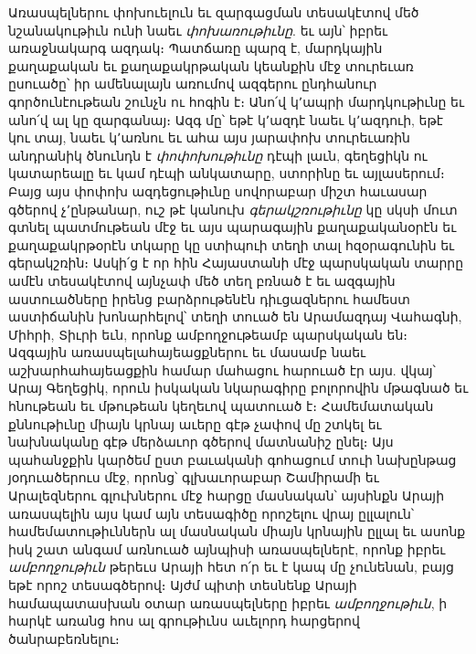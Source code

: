 \documentclass{article}
\begin{document}
{Առասպելներու փոխուելուն եւ զարգացման տեսակէտով մեծ նշանակութիւն ունի նաեւ \emph{փոխառութիւնը}. եւ այն՝ իբրեւ առաջնակարգ ազդակ։ Պատճառը պարզ է, մարդկային քաղաքական եւ քաղաքակրթական կեանքին մէջ տուրեւառ ըսուածը՝ իր ամենալայն առումով ազգերու ընդհանուր գործունէութեան շունչն ու հոգին է։ Անո՛վ կ՚ապրի մարդկութիւնը եւ անո՛վ ալ կը զարգանայ։ Ազգ մը՝ եթէ կ՚ազդէ նաեւ կ՚ազդուի, եթէ կու տայ, նաեւ կ՚առնու եւ ահա այս յարափոխ տուրեւառին անդրանիկ ծնունդն է \emph{փոփոխութիւնը} դէպի լաւն, գեղեցիկն ու կատարեալը եւ կամ դէպի անկատարը, ստորինը եւ այլասերում։ Բայց այս փոփոխ ազդեցութիւնը սովորաբար միշտ հաւասար գծերով չ՚ընթանար, ուշ թէ կանուխ \emph{գերակշռութիւնը} կը սկսի մուտ գտնել պատմութեան մէջ եւ այս պարագային քաղաքականօրէն եւ քաղաքակրթօրէն տկարը կը ստիպուի տեղի տալ հզօրագունին եւ գերակշռին։ Ասկի՛ց է որ հին Հայաստանի մէջ պարսկական տարրը ամէն տեսակէտով այնչափ մեծ տեղ բռնած է եւ ազգային աստուածները իրենց բարձրութենէն դիւցազներու համեստ աստիճանին խոնարհելով՝ տեղի տուած են Արամազդայ Վահագնի, Միհրի, Տիւրի եւն, որոնք ամբողջութեամբ պարսկական են։ Ազգային առասպելահայեացքներու եւ մասամբ նաեւ աշխարհահայեացքին համար մահացու հարուած էր այս. վկայ՝ Արայ Գեղեցիկ, որուն իսկական նկարագիրը բոլորովին մթագնած եւ հնութեան եւ մթութեան կեղեւով պատուած է։ Համեմատական քննութիւնը միայն կրնայ աւերը գէթ չափով մը շտկել եւ նախնականը գէթ մերձաւոր գծերով մատնանիշ ընել։ Այս պահանջքին կարծեմ ըստ բաւականի գոհացում տուի նախընթաց յօդուածերուս մէջ, որոնց՝ գլխաւորաբար Շամիրամի եւ Արալեզներու գլուխներու մէջ հարցը մասնական՝ այսինքն Արայի առասպելին այս կամ այն տեսագիծը որոշելու վրայ ըլլալուն՝ համեմատութիւններն ալ մասնական միայն կրնային ըլլալ եւ ասոնք իսկ շատ անգամ առնուած այնպիսի առասպելներէ, որոնք իբրեւ \emph{ամբողջութիւն} թերեւս Արայի հետ ո՛ր եւ է կապ մը չունենան, բայց եթէ որոշ տեսագծերով։ Այժմ պիտի տեսնենք Արայի համապատասխան օտար առասպելները իբրեւ \emph{ամբողջութիւն}, ի հարկէ առանց հոս ալ գրութիւնս աւելորդ հարցերով ծանրաբեռնելու։

}
\end{document}
